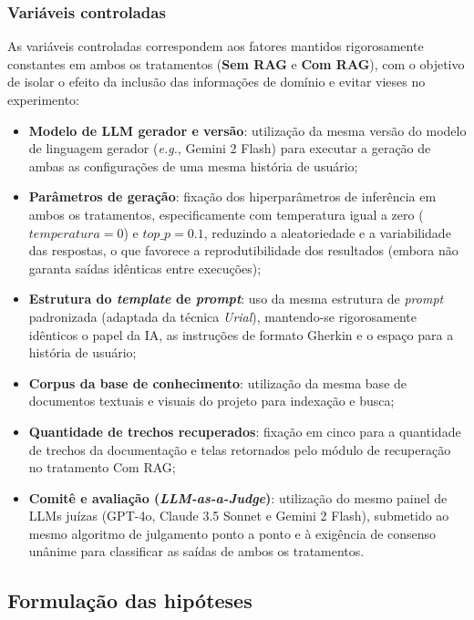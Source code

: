 \subsubsection*{Variáveis controladas}
As variáveis controladas correspondem aos fatores mantidos rigorosamente constantes em ambos os tratamentos (\textbf{Sem RAG} e \textbf{Com RAG}), com o objetivo de isolar o efeito da inclusão das informações de domínio e evitar vieses no experimento: 
\begin{itemize} 
    \item \textbf{Modelo de LLM gerador e versão}: utilização da mesma versão do modelo de linguagem gerador (\textit{e.g.}, Gemini 2 Flash) para executar a geração de ambas as configurações de uma mesma história de usuário; 
    \item \textbf{Parâmetros de geração}: fixação dos hiperparâmetros de inferência em ambos os tratamentos, especificamente com temperatura igual a zero ($temperatura = 0$) e $top\_p = 0.1$, reduzindo a aleatoriedade e a variabilidade das respostas, o que favorece a reprodutibilidade dos resultados (embora não garanta saídas idênticas entre execuções);
    \item \textbf{Estrutura do \textit{template} de \textit{prompt}}: uso da mesma estrutura de \textit{prompt} padronizada (adaptada da técnica \textit{Urial}), mantendo-se rigorosamente idênticos o papel da IA, as instruções de formato Gherkin e o espaço para a história de usuário; 
    \item \textbf{Corpus da base de conhecimento}: utilização da mesma base de documentos textuais e visuais do projeto para indexação e busca; 
    \item \textbf{Quantidade de trechos recuperados}: fixação em cinco para a quantidade de trechos da documentação e telas retornados pelo módulo de recuperação no tratamento Com RAG; 
    \item \textbf{Comitê e avaliação (\textit{LLM-as-a-Judge})}: utilização do mesmo painel de LLMs juízas (GPT-4o, Claude 3.5 Sonnet e Gemini 2 Flash), submetido ao mesmo algoritmo de julgamento ponto a ponto e à exigência de consenso unânime para classificar as saídas de ambos os tratamentos.
\end{itemize}

\subsection{Formulação das hipóteses}

